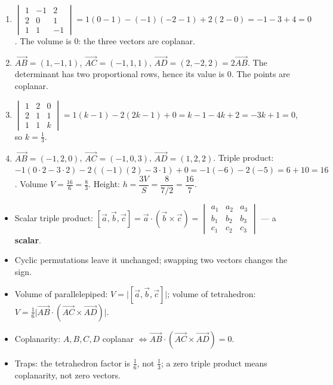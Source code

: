 \documentclass[11pt]{article}
\begin{document}
\begin{corrige}[Exercise 1]
\begin{enumerate}
\item $\begin{vmatrix} 1 & -1 & 2 \\ 2 & 0 & 1 \\ 1 & 1 & -1 \end{vmatrix} = 1(0-1) - (-1)(-2-1) + 2(2-0) = -1 - 3 + 4 = 0$. The volume is $0$: the three vectors are coplanar.
\item $\overrightarrow{AB} = (1,-1,1)$, $\overrightarrow{AC} = (-1,1,1)$, $\overrightarrow{AD} = (2,-2,2) = 2\overrightarrow{AB}$. The determinant has two proportional rows, hence its value is $0$. The points are coplanar.
\item $\begin{vmatrix} 1 & 2 & 0 \\ 2 & 1 & 1 \\ 1 & 1 & k \end{vmatrix} = 1(k - 1) - 2(2k - 1) + 0 = k - 1 - 4k + 2 = -3k + 1 = 0$, so $k = \tfrac13$.
\item $\overrightarrow{AB} = (-1,2,0)$, $\overrightarrow{AC} = (-1,0,3)$, $\overrightarrow{AD} = (1,2,2)$. Triple product: $-1(0\cdot 2 - 3\cdot 2) - 2((-1)(2) - 3\cdot 1) + 0 = -1(-6) - 2(-5) = 6 + 10 = 16$. Volume $V = \tfrac{16}{6} = \tfrac83$. Height: $h = \dfrac{3V}{S} = \dfrac{8}{7/2} = \dfrac{16}{7}$.
\end{enumerate}
\end{corrige}

\begin{aretenir}
\begin{itemize}
\item Scalar triple product: $[\vec{a},\vec{b},\vec{c}] = \vec{a} \cdot (\vec{b} \times \vec{c}) = \begin{vmatrix} a_1 & a_2 & a_3 \\ b_1 & b_2 & b_3 \\ c_1 & c_2 & c_3 \end{vmatrix}$ --- a \textbf{scalar}.
\item Cyclic permutations leave it unchanged; swapping two vectors changes the sign.
\item Volume of parallelepiped: $V = \bigl| [\vec{a},\vec{b},\vec{c}] \bigr|$; volume of tetrahedron: $V = \tfrac16 \bigl| \overrightarrow{AB} \cdot (\overrightarrow{AC} \times \overrightarrow{AD}) \bigr|$.
\item Coplanarity: $A, B, C, D$ coplanar $\iff \overrightarrow{AB} \cdot (\overrightarrow{AC} \times \overrightarrow{AD}) = 0$.
\item Traps: the tetrahedron factor is $\tfrac16$, not $\tfrac13$; a zero triple product means coplanarity, not zero vectors.
\end{itemize}
\end{aretenir}
\end{document}
